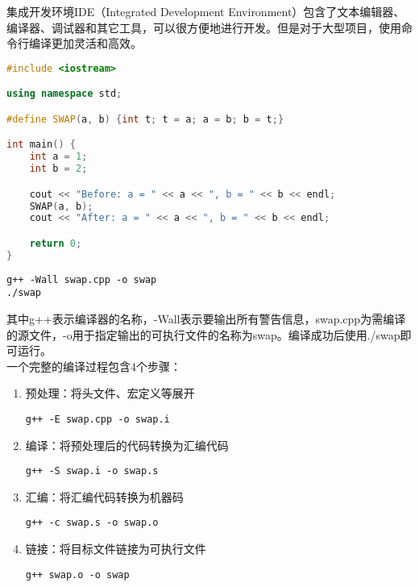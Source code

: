 集成开发环境IDE（Integrated Development Environment）包含了文本编辑器、编译器、调试器和其它工具，可以很方便地进行开发。但是对于大型项目，使用命令行编译更加灵活和高效。\\


\begin{lstlisting}[language=C++]
#include <iostream>

using namespace std;

#define SWAP(a, b) {int t; t = a; a = b; b = t;}

int main() {
    int a = 1;
    int b = 2;

    cout << "Before: a = " << a << ", b = " << b << endl;
    SWAP(a, b);
    cout << "After: a = " << a << ", b = " << b << endl;

    return 0;
}
\end{lstlisting}

\vspace{-0.5cm}

\begin{lstlisting}
g++ -Wall swap.cpp -o swap
./swap
\end{lstlisting}

其中g++表示编译器的名称，-Wall表示要输出所有警告信息，swap.cpp为需编译的源文件，-o用于指定输出的可执行文件的名称为swap。编译成功后使用./swap即可运行。\\

一个完整的编译过程包含4个步骤：

\begin{enumerate}
    \item 预处理：将头文件、宏定义等展开
          \vspace{-0.5cm}
          \begin{lstlisting}
g++ -E swap.cpp -o swap.i
            \end{lstlisting}

    \item 编译：将预处理后的代码转换为汇编代码
          \vspace{-0.5cm}
          \begin{lstlisting}
g++ -S swap.i -o swap.s
            \end{lstlisting}

    \item 汇编：将汇编代码转换为机器码
          \vspace{-0.5cm}
          \begin{lstlisting}
g++ -c swap.s -o swap.o
            \end{lstlisting}

    \item 链接：将目标文件链接为可执行文件
          \vspace{-0.5cm}
          \begin{lstlisting}
g++ swap.o -o swap
            \end{lstlisting}
\end{enumerate}

